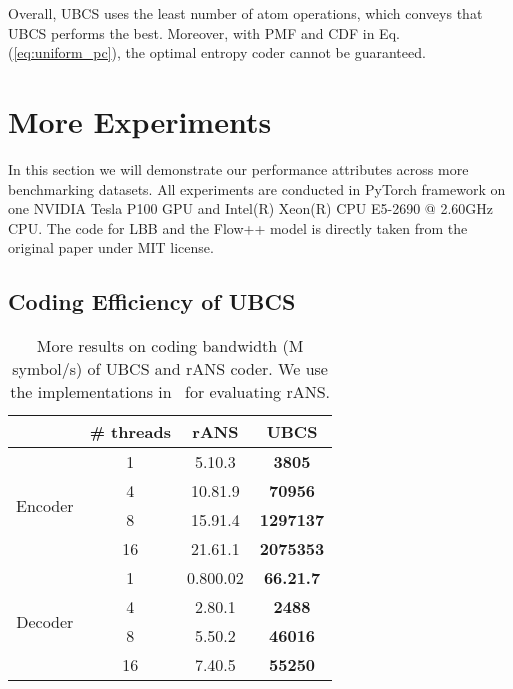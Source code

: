 \documentclass{article}
\newcommand{\ebar}[1]{{\tiny #1}}
\begin{document}
Overall, UBCS uses the least number of atom operations, which conveys that UBCS performs the best. Moreover, with PMF and CDF in Eq. (\ref{eq:uniform_pc}), the optimal entropy coder cannot be guaranteed. 

\section{More Experiments}

In this section we will demonstrate our performance attributes across more benchmarking datasets. All experiments are conducted in PyTorch framework on one NVIDIA Tesla P100 GPU and Intel(R) Xeon(R) CPU E5-2690 @ 2.60GHz CPU. The code for LBB and the Flow++ model is directly taken from the original paper under MIT license. 


\subsection{Coding Efficiency of UBCS}

\begin{table}[t]
\centering
\small
\caption{More results on coding bandwidth (M symbol/s) of UBCS and rANS coder. We use the implementations in~\cite{ho2019compression} for evaluating rANS.}
\label{tab:more_coders}
\begin{tabular}{cccc}
\toprule
 & \# threads & rANS & \textbf{UBCS} \\
\midrule
\multirow{4}{*}{Encoder} & 1 & 5.1\ebar{0.3} & \bf 380\ebar{5} \\
 & 4 & 10.8\ebar{1.9} & \bf 709\ebar{56} \\
 & 8 & 15.9\ebar{1.4} & \bf 1297\ebar{137} \\
 & 16 & 21.6\ebar{1.1} & \bf 2075\ebar{353} \\
\midrule
\multirow{4}{*}{Decoder} & 1 & 0.80\ebar{0.02} & \bf 66.2\ebar{1.7} \\
 & 4 & 2.8\ebar{0.1} & \bf 248\ebar{8} \\
 & 8 & 5.5\ebar{0.2} & \bf 460\ebar{16} \\
 & 16 & 7.4\ebar{0.5} & \bf 552\ebar{50} \\
\bottomrule
\end{tabular}
\end{table} 
\end{document}
